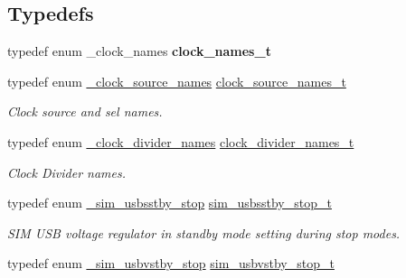 \subsection*{Typedefs}
\begin{DoxyCompactItemize}
\item 
typedef enum \+\_\+clock\+\_\+names {\bfseries clock\+\_\+names\+\_\+t}\hypertarget{group__sim__hal_ga97947bca6543a154dc0b1174fdf6c82d}{}\label{group__sim__hal_ga97947bca6543a154dc0b1174fdf6c82d}

\item 
typedef enum \hyperlink{group__sim__hal_ga77ad0e23383945c5b3e677455627c0fe}{\+\_\+clock\+\_\+source\+\_\+names} \hyperlink{group__sim__hal_ga9c9127c1f219ab5bfb55d7041124a8bf}{clock\+\_\+source\+\_\+names\+\_\+t}\hypertarget{group__sim__hal_ga9c9127c1f219ab5bfb55d7041124a8bf}{}\label{group__sim__hal_ga9c9127c1f219ab5bfb55d7041124a8bf}

\begin{DoxyCompactList}\small\item\em Clock source and sel names. \end{DoxyCompactList}\item 
typedef enum \hyperlink{group__sim__hal_ga48bb70d28e353a255009c5762b248970}{\+\_\+clock\+\_\+divider\+\_\+names} \hyperlink{group__sim__hal_ga51a225b8eb0e0d00e7911b3603d7caa2}{clock\+\_\+divider\+\_\+names\+\_\+t}\hypertarget{group__sim__hal_ga51a225b8eb0e0d00e7911b3603d7caa2}{}\label{group__sim__hal_ga51a225b8eb0e0d00e7911b3603d7caa2}

\begin{DoxyCompactList}\small\item\em Clock Divider names. \end{DoxyCompactList}\item 
typedef enum \hyperlink{group__sim__hal_gae03f4921f897f628aacaae2aa34a9519}{\+\_\+sim\+\_\+usbsstby\+\_\+stop} \hyperlink{group__sim__hal_ga3e6c7010d80a822f8224ce7bdc525576}{sim\+\_\+usbsstby\+\_\+stop\+\_\+t}\hypertarget{group__sim__hal_ga3e6c7010d80a822f8224ce7bdc525576}{}\label{group__sim__hal_ga3e6c7010d80a822f8224ce7bdc525576}

\begin{DoxyCompactList}\small\item\em S\+IM U\+SB voltage regulator in standby mode setting during stop modes. \end{DoxyCompactList}\item 
typedef enum \hyperlink{group__sim__hal_ga7fafd70d9012b3c106f260e4e169fbfe}{\+\_\+sim\+\_\+usbvstby\+\_\+stop} \hyperlink{group__sim__hal_ga640e85f65b3412e5ce73dcf90c577bd2}{sim\+\_\+usbvstby\+\_\+stop\+\_\+t}\hypertarget{group__sim__hal_ga640e85f65b3412e5ce73dcf90c577bd2}{}\label{group__sim__hal_ga640e85f65b3412e5ce73dcf90c577bd2}


\end{DoxyCompactItemize}
